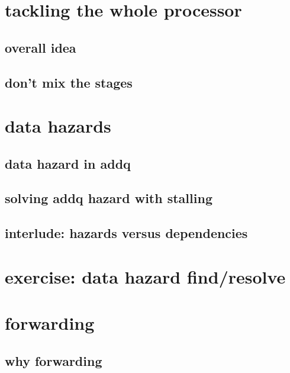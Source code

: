

\section{tackling the whole processor}

\subsection{overall idea}



\subsection{don't mix the stages}





\section{data hazards}

\subsection{data hazard in addq}


\subsection{solving addq hazard with stalling}


\subsection{interlude: hazards versus dependencies}


\section{exercise: data hazard find/resolve}


\section{forwarding}
\subsection{why forwarding}



